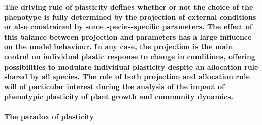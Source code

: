 \textbf{
The driving rule of plasticity defines whether or not the choice of the phenotype is fully determined by the projection of external conditions or also constrained by some species-specific parameters. The effect of this balance between projection and parameters has a large influence on the model behaviour. In any case, the projection is the main control on individual plastic response to change in conditions, offering possibilities to modulate individual plasticity despite an allocation rule shared by all species. The role of both projection and allocation rule will of particular interest during the analysis of the impact of phenotypic plasticity of plant growth and community dynamics.}

\paragraph{The paradox of plasticity}

